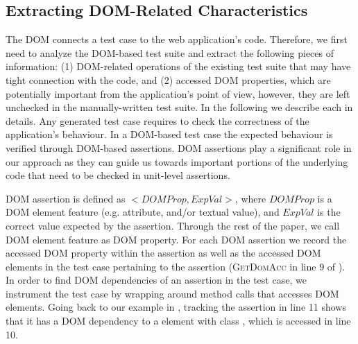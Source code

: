 \subsection{Extracting DOM-Related Characteristics} \label{Sec:extractDomRelatedInfo}
The DOM connects a test case to the web application's \javascript code. Therefore, we first need to analyze the DOM-based test suite and extract the following pieces of information: (1) DOM-related operations of the existing test suite that may have tight connection with the \javascript code, and (2) accessed DOM properties, which are potentially important from the application's point of view, however, they are left unchecked in the manually-written test suite. In the following we describe each in details.
Any generated test case requires to check the correctness of the application's behaviour. In a DOM-based test case the expected behaviour is verified through DOM-based assertions. 
DOM assertions play a significant role in our approach as they can guide us towards important portions of the underlying \javascript code that need to be checked in unit-level assertions.

DOM assertion is defined as $<DOMProp,ExpVal>$, where $DOMProp$ is a DOM element feature (e.g. attribute, and/or textual value), and $ExpVal$ is the correct value expected by the assertion. Through the rest of the paper, we call DOM element feature as DOM property.
For each DOM assertion we record the accessed DOM property within the assertion as well as the accessed DOM elements in the test case pertaining to the assertion (\textsc{GetDomAcc} in line 9 of ). 
In order to find DOM dependencies of an assertion in the test case, we instrument the test case by wrapping around method calls that accesses DOM elements.
Going back to our example in , tracking the assertion in line 11 shows that it has a DOM dependency to a  element with class , which is accessed in line 10.   
 
